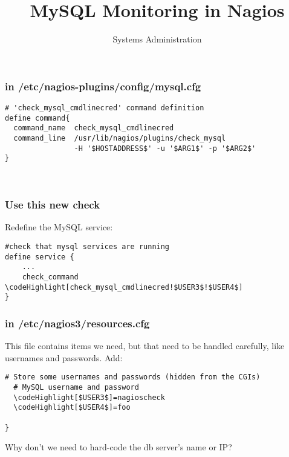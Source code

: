 \documentclass[10pt]{beamer}
\title{MySQL Monitoring in Nagios}
\author[IN719]{Systems Administration}
\institute[Otago Polytechnic]{
  School of Information Technology \\
  Otago Polytechnic \\
  Dunedin, New Zealand \\
}
\date{}
\newcommand\codeHighlight[1]{\textcolor[rgb]{1,0,0}{\textbf{#1}}}
\begin{document}
\begin{frame}[plain]
  \titlepage
\end{frame}


\begin{frame}[fragile]
  \frametitle{in /etc/nagios-plugins/config/mysql.cfg}

\begin{Verbatim}[commandchars=\\\[\]]
# 'check_mysql_cmdlinecred' command definition
define command{
  command_name  check_mysql_cmdlinecred
  command_line  /usr/lib/nagios/plugins/check_mysql
                -H '$HOSTADDRESS$' -u '$ARG1$' -p '$ARG2$'
}



\end{Verbatim}
\end{frame}
\begin{frame}[fragile]
  \frametitle{Use this new check}

Redefine the MySQL service:
\begin{Verbatim}[commandchars=\\\[\]]
#check that mysql services are running
define service {
	...
    check_command    \codeHighlight[check_mysql_cmdlinecred!$USER3$!$USER4$]
}

\end{Verbatim}
\end{frame}

\begin{frame}[fragile]
  \frametitle{in /etc/nagios3/resources.cfg}

This file contains items we need, but that need to be handled carefully, like
usernames and passwords.  Add:

\begin{Verbatim}[commandchars=\\\[\]]
  # Store some usernames and passwords (hidden from the CGIs)
  # MySQL username and password
  \codeHighlight[$USER3$]=nagioscheck
  \codeHighlight[$USER4$]=foo

}
\end{Verbatim}

Why don't we need to hard-code the db server's name or IP?

\end{frame}
\end{document}
